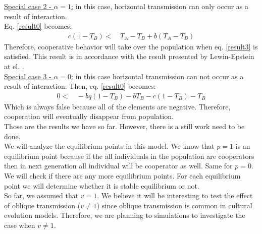 \documentclass[12pt]{extarticle}
\begin{document}
\underline{Special case 2 - $\alpha =1$:} in this case, horizontal transmission can only occur as a result of interaction.
\\Eq. \eqref{result0} becomes:
\begin{equation} 
\begin{split} \label{result3}
c(1-T_B)  < & \, T_A -T_B +b(T_A-T_B)
\end{split}
\end{equation}
Therefore, cooperative behavior will take over the population when eq. \eqref{result3} is satisfied. 
This result is in accordance with the result presented by Lewin-Epstein at el. \citep{Ohad}. 
\\\underline{Special case 3 - $\alpha = 0$:} in this case horizontal transmission can not occur as a result of interaction.  
Then, eq. \eqref{result0} becomes:
\begin{equation} 
\begin{split} \label{result4}
0 < & \,  - bq(1-T_B)- bT_B-c(1-T_B)-T_B
\end {split}
\end{equation}
Which is always false because all of the elements are negative. Therefore, cooperation will eventually disappear from population.
\\Those are the results we have so far. However, there is a still work need to be done. \\
We will analyze the equilibrium points in this model. We know that $p=1$ is an equilibrium point because if the all individuals in the population are cooperators then in next generation all individual will be cooperator as well. Same for $p=0$. We will check if there are any more equilibrium points. For each equilibrium point we will determine whether it is stable equilibrium or not. 
\\So far, we assumed that $v=1$. We believe it will be interesting to test the effect of oblique transmission ($v\neq 1$) since oblique transmission is common in cultural evolution models. Therefore, we are planning to simulations to investigate the case when $v\neq 1$. 
\end{document}
